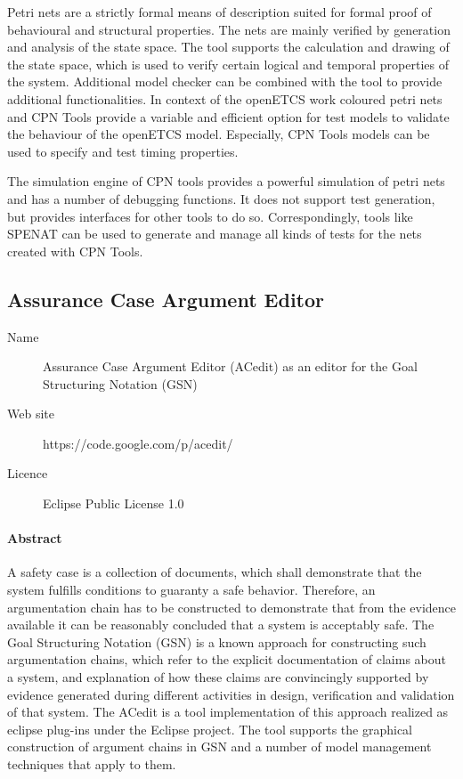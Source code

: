  Petri nets are a strictly formal means of description suited for formal proof of behavioural and structural properties. The nets are mainly verified by generation and analysis of the state space. The tool supports the calculation and drawing of the state space, which is used to verify certain logical and temporal properties of the system. Additional model checker can be combined with the tool to provide additional functionalities. In context of the openETCS work coloured petri nets and CPN Tools provide a variable and efficient option for test models to validate the behaviour of the openETCS model. Especially, CPN Tools models can be used to specify and test timing properties.
 
 The simulation engine of CPN tools provides a powerful simulation of petri nets and has a number of debugging functions. It does not support test generation, but provides interfaces for other tools to do so. Correspondingly, tools like SPENAT can be used to generate and manage all kinds of tests for the nets created with CPN Tools. 
 
\subsection{Assurance Case Argument Editor}
\label{sec:GSN}

\begin{description}
\item[Name] Assurance Case Argument Editor (ACedit) as an editor for the Goal Structuring Notation (GSN)
\item[Web site] https://code.google.com/p/acedit/
\item[Licence] Eclipse Public License 1.0
\end{description}

\paragraph{Abstract}

A safety case is a collection of documents, which shall demonstrate that the system fulfills conditions to guaranty a safe behavior. Therefore, an argumentation chain has to be constructed to demonstrate that from the evidence available it can be reasonably concluded that a system is acceptably safe.  The Goal Structuring Notation (GSN) is a known  approach  for  constructing such argumentation chains, which refer to the explicit documentation of claims about a system,  and  explanation  of  how  these  claims  are  convincingly  supported  by evidence generated during different activities in design, verification and validation of that system.
The ACedit is a tool implementation of this approach realized as eclipse plug-ins under the Eclipse project. The tool supports the graphical construction of argument chains in GSN and a number of model management techniques that apply to them.

